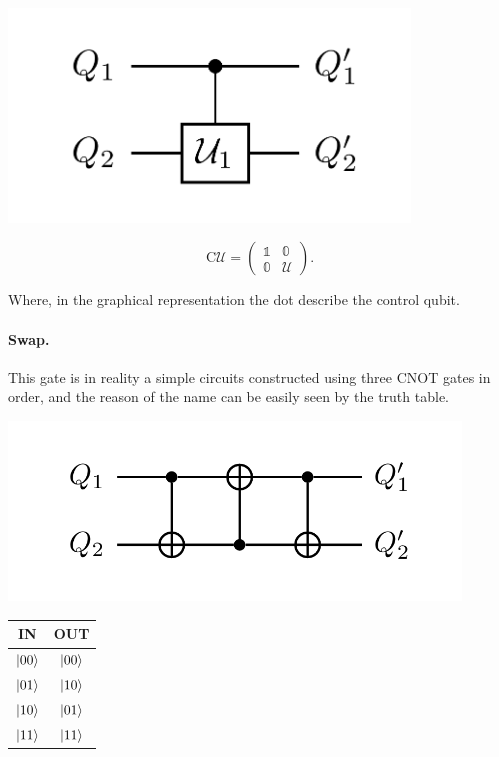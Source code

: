 \begin{minipage}{0.45\textwidth}
    \centering
    \includegraphics[width=0.8\textwidth]{Immagini/ContrU.pdf}
\end{minipage}
\hspace{-1cm}
\begin{minipage}{0.45\textwidth}
    \begin{equation}
        \text{C}\mathcal{U} = \begin{pmatrix}
            \mathbb{1} & \mathbb{0}\\
            \mathbb{0} & \mathcal{U}
        \end{pmatrix}.
    \end{equation}
\end{minipage}

\noindent
Where, in the graphical representation the dot describe the control qubit.

\paragraph{Swap.} This gate is in reality a simple circuits constructed using three CNOT gates in order, and the reason of the name can be easily seen by the truth table.

\begin{minipage}{0.45\textwidth}
    \centering
    \includegraphics[width=0.9\textwidth]{Immagini/SwapCirc.pdf}
\end{minipage}
\hspace{-1cm}
\begin{minipage}{0.45\textwidth}
    \centering
    \begin{tabular}{c|c}
        \textbf{IN} & \textbf{OUT}\\
        \midrule
        $\ket{00}$ & $\ket{00}$\\
        $\ket{01}$ & $\ket{10}$\\
        $\ket{10}$ & $\ket{01}$\\
        $\ket{11}$ & $\ket{11}$
    \end{tabular}
\end{minipage}
\vspace{0.3cm}

